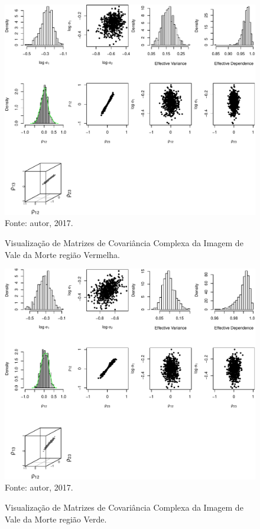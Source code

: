 \documentclass[journal]{IEEEtran}
\begin{document}
\newpage

\begin{figure}[ht]
\centering
\caption{Visualização de Matrizes de Covariância Complexa da Imagem de Vale da Morte região Vermelha.}
\includegraphics[width=\linewidth]{../../Figuras/Amostras-Death/Death-Vermelha-500.pdf}\\
Fonte: autor, 2017.
\label{visDeath3}
\end{figure}

\newpage

\begin{figure}[ht]
\centering
\caption{Visualização de Matrizes de Covariância Complexa da Imagem de Vale da Morte região Verde.}
\includegraphics[width=\linewidth]{../../Figuras/Amostras-Death/Death-Verde-500.pdf}\\
Fonte: autor, 2017.
\label{visDeath4}
\end{figure}
\end{document}
